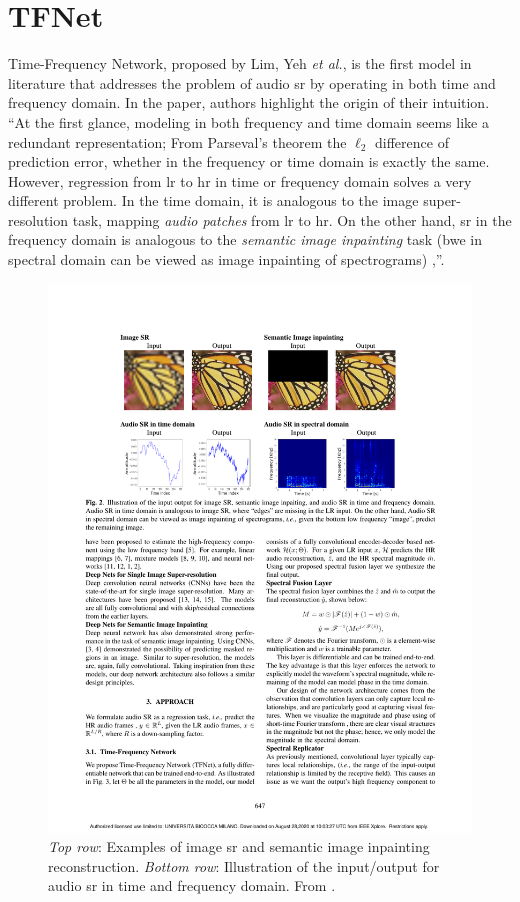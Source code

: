 \section{TFNet} \label{tfnet}
Time-Frequency Network, proposed by Lim, Yeh \textit{et  al.}\cite{lim2018time}, is the first model in literature that addresses the problem of audio \gls{sr} by operating in both time and frequency domain. In the paper, authors highlight the origin of their intuition. “At the first glance, modeling in both frequency and time domain seems like a redundant representation; From Parseval’s theorem the $\ell_{2}$ difference of prediction error, whether in the frequency or time domain is exactly the same. However, regression from \gls{lr} to \gls{hr} in time or frequency domain solves a very different problem. In the time domain, it is analogous to the image super-resolution task, mapping \textit{audio patches} from \gls{lr} to \gls{hr}. On the other hand, \gls{sr} in the frequency domain is analogous to the \textit{semantic image inpainting} task (\gls{bwe} in spectral domain can be viewed as image inpainting of spectrograms) \cite{pathak2016context},\cite{yeh2017semantic}”. \\
\begin{figure}[H]
	\begin{center}
		\includegraphics[scale=1.11]{img/tfnet_intuition.pdf}
		\captionsetup{margin=2cm}
		\caption{\textit{Top row}: Examples of image \gls{sr} and semantic image inpainting reconstruction. \textit{Bottom row}: Illustration of the input/output for audio \gls{sr} in time and frequency domain. From \cite{lim2018time}.}
		\label{fig:tfnet_intuition}
	\end{center}
\end{figure}

